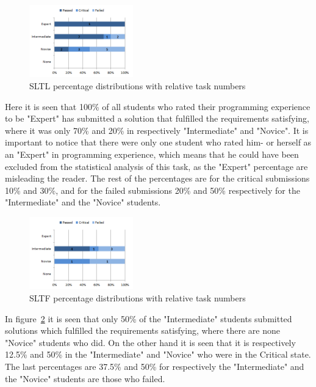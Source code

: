 \documentclass{sig-alternate-05-2015}
\begin{document}
\begin{figure}[H]
	\centering
	\includegraphics[width=0.4\textwidth]{img06}
	\caption{SLTL percentage distributions with relative task numbers}
	\label{fig:SLTL percentage distributions with relative task numbers}
\end{figure}

Here it is seen that 100\% of all students who rated their programming experience to be "Expert" has submitted a solution that fulfilled the requirements satisfying, where it was only 70\% and 20\% in respectively "Intermediate" and "Novice".
It is important to notice that there were only one student who rated him- or herself as an "Expert" in programming experience, which means that he could have been excluded from the statistical analysis of this task, as the "Expert" percentage are misleading the reader. The rest of the percentages are for the critical submissions 10\% and 30\%, and for the failed submissions 20\% and 50\% respectively for the "Intermediate" and the "Novice" students.

\begin{figure}[H]
	\centering
	\includegraphics[width=0.4\textwidth]{img07}
	\caption{SLTF percentage distributions with relative task numbers}
	\label{fig:SLTF percentage distributions with relative task numbers}
\end{figure}

In figure~\ref{fig:SLTF percentage distributions with relative task numbers} it is seen that only 50\% of the "Intermediate" students submitted solutions which fulfilled the requirements satisfying, where there are none "Novice" students who did. On the other hand it is seen that it is respectively 12.5\% and 50\% in the "Intermediate" and "Novice" who were in the Critical state. The last percentages are 37.5\% and 50\% for respectively the "Intermediate" and the "Novice" students are those who failed.
\end{document}
